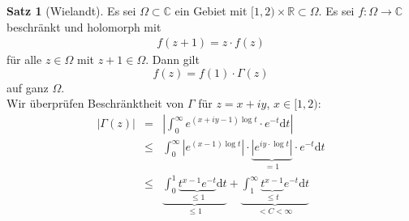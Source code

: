 \documentclass[11pt,titlepage]{article}
\theoremstyle{definition}
\newtheorem{theorem}{Satz}[section]
\theoremstyle{remark}
\begin{document}
	\begin{theorem}[Wielandt]
		Es sei $\Omega\subset\mathbb{C}$ ein Gebiet mit $[1,2)\times\mathbb{R}\subset\Omega$. Es sei 
		$f:\Omega\to\mathbb{C}$ beschränkt und holomorph mit
		\begin{eqnarray}
			f(z+1)=z\cdot f(z) \label{thm:Wielandt;1}
		\end{eqnarray}
		für alle $z\in\Omega$ mit $z+1\in\Omega$. Dann gilt 
		\[ f(z)=f(1)\cdot \Gamma(z) \]
		auf ganz $\Omega$. \\
		Wir überprüfen Beschränktheit von $\Gamma$ für $z=x+iy$, $x\in [1,2)$:
		\begin{eqnarray*}
			|\Gamma(z)| &=&\left| \int_0^{\infty} e^{(x+iy-1)\log t}\cdot e^{-t}\mathrm{d}t \right| \\
			&\leq& \int_0^{\infty} \left| e^{(x-1)\log t}\right|\cdot\underbrace{\left| e^{iy\cdot \log t} \right|}_{=1}\cdot e^{-t}
			\mathrm{d}t \\
			&\leq& \underbrace{ \int_0^1 \underbrace{ t^{x-1}e^{-t}}_{\leq 1} \mathrm{d}t}_{\leq 1} +
			\underbrace{ \int_1^{\infty} \underbrace{ t^{x-1}}_{\leq t}e^{-t}\mathrm{d}t}_{< C<\infty}
		\end{eqnarray*}
		
		
		
		
	\end{theorem}
	
\end{document}
